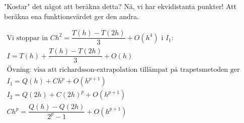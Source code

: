 \noindent "Kostar" det något att beräkna detta? Nä, vi har ekvidistanta punkter! Att beräkna ena funktionsvärdet ger den andra.


\begin{equation*}
  \begin{gathered}
    \text{Vi stoppar in } Ch^2 = \dfrac{T(h)-T(2h)}{3}+O(h^4) \text{ i } I_1:\\
    I = T(h)+\dfrac{T(h)-T(2h)}{3}+O(h)\\
    \text{Övning: visa att richardsson-extrapolation tillämpat på trapetsmetoden ger simpsons}\\
    I_1=Q(h)+Ch^p+O(h^{p+1})\\
    I_2=Q(2h)+C(2h)^p+O(h^{p+1})\\
    Ch^p = \dfrac{Q(h)-Q(2h)}{2^p-1}+O(h^{p+1})
  \end{gathered}
\end{equation*}


















